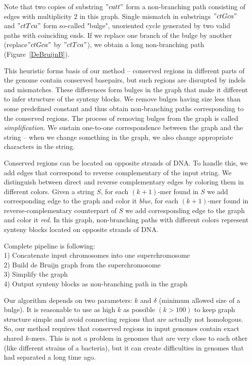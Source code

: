 \documentclass[a4paper, 12pt]{scrartcl}
\begin{document}
Note that two copies of substring \("catt"\) form a non-branching path consisting of edges with multiplicity \(2\) in this graph. Single
mismatch in substrings \("ctGca"\) and \("ctTca"\) form so-called "bulge", unoriented cycle generated by two valid paths with
coinciding ends. If we replace one branch of the bulge by another (replace\("ctGca"\) by \("ctTca"\)), we obtain
a long non-branching path (Figure~\ref{DeBruijnB}).

This heuristic forms basis of our method -- conserved regions in different parts of the genome contain conserved basepairs, but
such regions are disrupted by indels and mismatches. These differences form bulges in the graph that make it different to infer
structure of the synteny blocks. We remove bulges having size less than some predefined constant and thus obtain non-branching
paths corresponding to the conserved regions. The process of removing bulges from the graph is called \textit{simplification}. We
sustain one-to-one correspondence between the graph and the string -- when we change something in the graph, we also change
appropriate characters in the string.

Conserved regions can be located on opposite strands of DNA. To handle this, we add edges that correspond to reverse complementary
of the input string. We distinguish between direct and reverse complementary edges by coloring them in different colors.
Given a string \(S\), for each \((k + 1)\)-mer found in \(S\) we add corresponding edge to the graph and color it \textit{blue}, for 
each \((k + 1)\)-mer found in reverse-complementary counterpart of \(S\) we add corresponding edge to the graph and color it \textit{red}.
In this graph, non-branching paths with different colors represent synteny blocks located on opposite strands of DNA.

Complete pipeline is following:\\
1) Concatenate input chromosomes into one superchromosome \\
2) Build de Bruijn graph from the superchromosome \\
3) Simplify the graph \\
4) Output synteny blocks as non-branching path in the graph 

Our algorithm depends on two parameters: \(k\) and \(\delta\) (minimum allowed size of a bulge). It is reasonable to use as high \(k\) as possible
\((k > 100)\) to keep graph structure simple and avoid connecting regions that are actually not homologous. So, our method requires that conserved regions
in input genomes contain exact shared \(k\)-mers. This is not a problem in genomes that are very close to each other (like different strains of a bacteria),
but it can create difficulties in genomes that had separated a long time ago.
\end{document}
